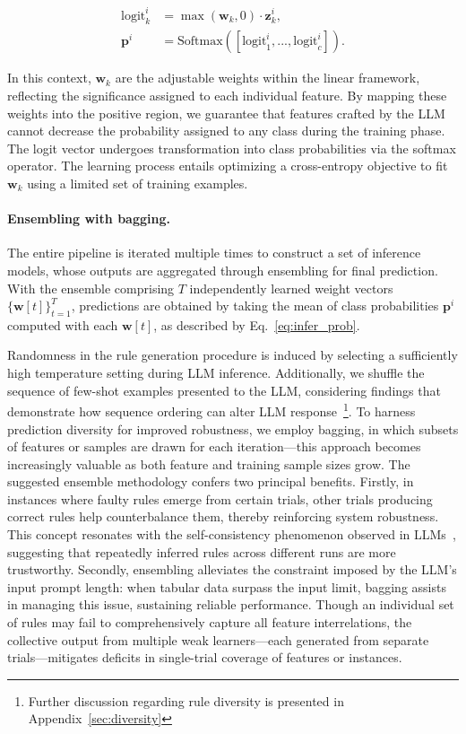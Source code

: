 \begin{align}
\text{logit}_k^i &= \max(\mathbf{w}_k, 0) \cdot \mathbf{z}_k^i, \nonumber \\
\mathbf{p}^i &= \text{Softmax}({[\text{logit}_{1}^i, ..., \text{logit}_{c}^i]}). \label{eq:infer_prob}
\end{align}

In this context, $\mathbf{w}_k$ are the adjustable weights within the linear framework, reflecting the significance assigned to each individual feature. By mapping these weights into the positive region, we guarantee that features crafted by the LLM cannot decrease the probability assigned to any class during the training phase. The logit vector undergoes transformation into class probabilities via the softmax operator. The learning process entails optimizing a cross-entropy objective to fit $\mathbf{w}_k$ using a limited set of training examples.

\vspace*{-0.12in}
\paragraph{Ensembling with bagging.} The entire pipeline is iterated multiple times to construct a set of inference models, whose outputs are aggregated through ensembling for final prediction. With the ensemble comprising $T$ independently learned weight vectors $\{\mathbf{w}[t]\}_{t=1}^T$, predictions are obtained by taking the mean of class probabilities $\mathbf{p}^i$ computed with each $\mathbf{w}[t]$, as described by Eq.~\ref{eq:infer_prob}.

Randomness in the rule generation procedure is induced by selecting a sufficiently high temperature setting during LLM inference. Additionally, we shuffle the sequence of few-shot examples presented to the LLM, considering findings that demonstrate how sequence ordering can alter LLM response~\cite{lu2022fantastically}\footnote{Further discussion regarding rule diversity is presented in Appendix~\ref{sec:diversity}}. To harness prediction diversity for improved robustness, we employ bagging, in which subsets of features or samples are drawn for each iteration—this approach becomes increasingly valuable as both feature and training sample sizes grow. The suggested ensemble methodology confers two principal benefits. Firstly, in instances where faulty rules emerge from certain trials, other trials producing correct rules help counterbalance them, thereby reinforcing system robustness. This concept resonates with the self-consistency phenomenon observed in LLMs~\cite{wang2022self}, suggesting that repeatedly inferred rules across different runs are more trustworthy. Secondly, ensembling alleviates the constraint imposed by the LLM’s input prompt length: when tabular data surpass the input limit, bagging assists in managing this issue, sustaining reliable performance. Though an individual set of rules may fail to comprehensively capture all feature interrelations, the collective output from multiple weak learners—each generated from separate trials—mitigates deficits in single-trial coverage of features or instances.

